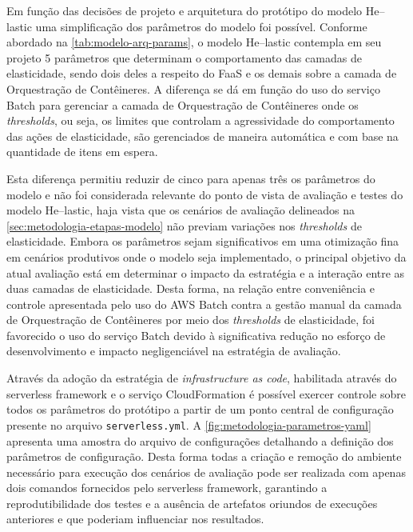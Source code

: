 \documentclass[english,brazilian]{UNISINOSmonografia} %
\begin{document}
Em função das decisões de projeto e arquitetura do protótipo do modelo \textsf{He}--lastic uma simplificação dos parâmetros do modelo foi possível.
%
Conforme abordado na \autoref{tab:modelo-arq-params}, o modelo \textsf{He}--lastic contempla em seu projeto 5 parâmetros que determinam o comportamento das camadas de elasticidade, sendo dois deles a respeito do FaaS e os demais sobre a camada de Orquestração de Contêineres.
%
A diferença se dá em função do uso do serviço Batch para gerenciar a camada de Orquestração de Contêineres onde os \textit{thresholds}, ou seja, os limites que controlam a agressividade do comportamento das ações de elasticidade, são gerenciados de maneira automática e com base na quantidade de itens em espera.


Esta diferença permitiu reduzir de cinco para apenas três os parâmetros do modelo e não foi considerada relevante do ponto de vista de avaliação e testes do modelo \textsf{He}--lastic, haja vista que os cenários de avaliação delineados na \autoref{sec:metodologia-etapas-modelo} não previam variações nos \textit{thresholds} de elasticidade.
%
Embora os parâmetros sejam significativos em uma otimização fina em cenários produtivos onde o modelo seja implementado, o principal objetivo da atual avaliação está em determinar o impacto da estratégia  e a interação entre as duas camadas de elasticidade.
%
Desta forma, na relação entre conveniência e controle apresentada pelo uso do AWS Batch contra a gestão manual da camada de Orquestração de Contêineres por meio dos \textit{thresholds} de elasticidade, foi favorecido o uso do serviço Batch devido à significativa redução no esforço de desenvolvimento e impacto negligenciável na estratégia de avaliação.



Através da adoção da estratégia de \textit{infrastructure as code}, habilitada através do serverless framework e o serviço CloudFormation é possível exercer controle sobre todos os parâmetros do protótipo a partir de um ponto central de configuração presente no arquivo \texttt{serverless.yml}.
%
A \autoref{fig:metodologia-parametros-yaml} apresenta uma amostra do arquivo de configurações detalhando a definição dos parâmetros de configuração.
%
Desta forma todas a criação e remoção do ambiente necessário para execução dos cenários de avaliação pode ser realizada com apenas dois comandos fornecidos pelo serverless framework, garantindo a reprodutibilidade dos testes e a ausência de artefatos oriundos de execuções anteriores e que poderiam influenciar nos resultados.
\end{document}
